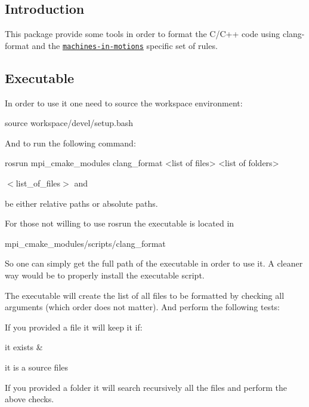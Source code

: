 \subsection*{Introduction}

This package provide some tools in order to format the C/\+C++ code using clang-\/format and the \href{https://machines-in-motion.github.io/code_documentation/ci_example_cpp/coding_guidelines_1.html}{\tt machines-\/in-\/motions} specific set of rules.

\subsection*{Executable}

In order to use it one need to source the workspace environment\+: \begin{DoxyVerb}source workspace/devel/setup.bash
\end{DoxyVerb}


And to run the following command\+: \begin{DoxyVerb}rosrun mpi_cmake_modules clang_format <list of files> <list of folders>
\end{DoxyVerb}


$<$list\+\_\+of\+\_\+files$>$ and 
\begin{DoxyItemize}
\end{DoxyItemize}be either relative paths or absolute paths.

For those not willing to use rosrun the executable is located in \begin{DoxyVerb}mpi_cmake_modules/scripts/clang_format
\end{DoxyVerb}


So one can simply get the full path of the executable in order to use it. A cleaner way would be to properly install the executable script.

The executable will create the list of all files to be formatted by checking all arguments (which order does not matter). And perform the following tests\+:
\begin{DoxyItemize}
\item If you provided a file it will keep it if\+:
\begin{DoxyItemize}
\item it exists \&
\item it is a source files
\end{DoxyItemize}
\item If you provided a folder it will search recursively all the files and perform the above checks.
\end{DoxyItemize}

